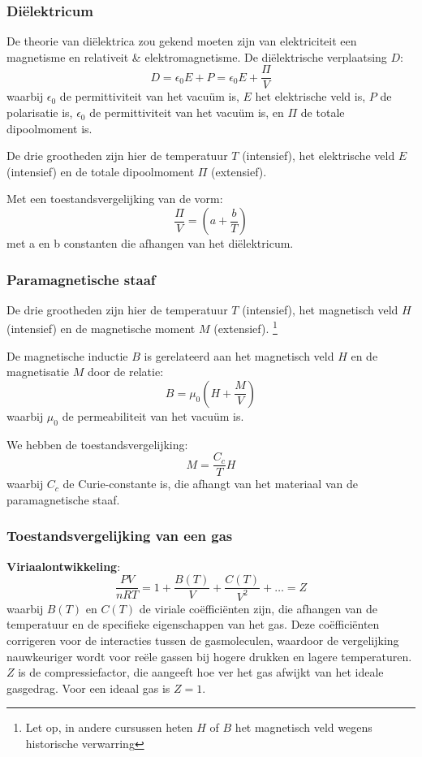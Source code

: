 \subsubsection{Diëlektricum}

De theorie van diëlektrica zou gekend moeten zijn van elektriciteit een magnetisme en relativeit \& elektromagnetisme.
De diëlektrische verplaatsing \(D\):
\[D = \epsilon_0 E  + P = \epsilon_0 E + \frac{\Pi}{V}\]
waarbij \(\epsilon_0\) de permittiviteit van het vacuüm is, \(E\) het elektrische veld is, \(P\) de polarisatie is, \(\epsilon_0\) de permittiviteit van het vacuüm is, en \(\Pi\) de totale dipoolmoment is.

De drie grootheden zijn hier de temperatuur \(T\) (intensief), het elektrische veld \(E\) (intensief) en de totale dipoolmoment \(\Pi\) (extensief).

Met een toestandsvergelijking van de vorm:
\[\frac{\Pi}{V} = \left(a + \frac{b}{T} \right)\]
met a en b constanten die afhangen van het diëlektricum.

\subsubsection{Paramagnetische staaf}

De drie grootheden zijn hier de temperatuur \(T\) (intensief), het magnetisch veld \(H\) (intensief) en de magnetische moment \(M\) (extensief).
\footnote{Let op, in andere cursussen heten \(H\) of \(B\) het magnetisch veld wegens historische verwarring}

De magnetische inductie \(B\) is gerelateerd aan het magnetisch veld \(H\) en de magnetisatie \(M\) door de relatie:
\[B = \mu_0 (H + \frac{M}{V})\]
waarbij \(\mu_0\) de permeabiliteit van het vacuüm is.

We hebben de toestandsvergelijking:
\[M = \frac{C_c}{T} H\]
waarbij \(C_c\) de Curie-constante is, die afhangt van het materiaal van de paramagnetische staaf.

\subsubsection{Toestandsvergelijking van een gas }

\textbf{Viriaalontwikkeling}:
\[\frac{PV}{nRT} = 1 + \frac{B(T)}{V} + \frac{C(T)}{V^2} + \ldots = Z\]
waarbij \(B(T)\) en \(C(T)\) de viriale coëfficiënten zijn, die afhangen van de temperatuur en de specifieke eigenschappen van het gas. Deze coëfficiënten corrigeren voor de interacties tussen de gasmoleculen, waardoor de vergelijking nauwkeuriger wordt voor reële gassen bij hogere drukken en lagere temperaturen.
\(Z\) is de compressiefactor, die aangeeft hoe ver het gas afwijkt van het ideale gasgedrag. Voor een ideaal gas is \(Z = 1\).

